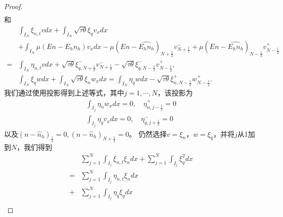 \begin{proof}
\begin{gather*}
    \end{gather*}
    和
    $$
        \begin{aligned}
              & \int_{I_{N}} \xi_{n, t} v d x+\int_{I_{N}} \sqrt{\tau \theta} \xi_{q} v_{x} d x                                                                                                                                         \\
              & +\int_{I_{N}} \mu\left(E n-E_{h} n_{h}\right) v_{x} d x-\mu\left(E n-\widehat{E_{h} n_{h}}\right)_{N+\frac{1}{2}} v_{N+\frac{1}{2}}^{-}+\mu\left(E n-\widehat{E_{h} n_{h}}\right)_{N-\frac{1}{2}} v_{N-\frac{1}{2}}^{+} \\
            = & \int_{I_{N}} \eta_{n, t} v d x+\sqrt{\tau \theta} \xi_{q, N+\frac{1}{2}}^{-} v_{N+\frac{1}{2}}^{-}-\sqrt{\tau \theta} \xi_{q, N-\frac{1}{2}}^{-} v_{N-\frac{1}{2}}^{+},                                                 \\
              & \int_{I_{N}} \xi_{q} w d x+\int_{I_{N}} \sqrt{\tau \theta} \xi_{n} w_{x} d x=\int_{I_{N}} \eta_{q} w d x-\sqrt{\tau \theta} \xi_{n, N-\frac{1}{2}}^{+} w_{N-\frac{1}{2}}^{+} .
        \end{aligned}
    $$
    我们通过使用投影得到上述等式，其中$j=1, \cdots, N$，该投影为
    $$
        \begin{gathered}
            \int_{I_{j}} \eta_{n} w_{x} d x=0, \quad \eta_{n, j-\frac{1}{2}}^{+}=0 \\
            \int_{I_{j}} \eta_{q} v_{x} d x=0, \quad \eta_{q, j+\frac{1}{2}}^{-}=0
        \end{gathered}
    $$
    以及$\left(n-\hat{n}_{h}\right)_{\frac{1}{2}}=0,\left(n-\hat{n}_{h}\right)_{N+\frac{1}{2}}=0$。
    仍然选择$v=\xi_{n}$，$w=\xi_{q}$，并将$j$从1加到$N$，我们得到
    \begin{equation}
        \begin{aligned}
              & \sum_{j=1}^{N} \int_{I_{j}} \xi_{n, t} \xi_{n} d x+\sum_{j=1}^{N} \int_{I_{j}} \xi_{q}^{2} d x                                                                                                                   \\
            = & \sum_{j=1}^{N} \int_{I_{j}} \eta_{n, t} \xi_{n} d x                                                                                                                                                              \\
            + & \sum_{j=1}^{N} \int_{I_{j}} \eta_{q} \xi_{q} d x                                                                                                                                                                 \\

\end{aligned}
\end{equation}
\end{proof}
